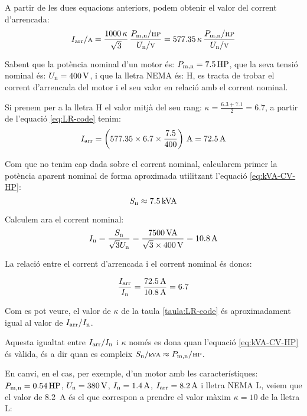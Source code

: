 A partir de les dues equacions anteriors, podem obtenir el valor del corrent d'arrencada:
\begin{equation}
    I\ped{arr}/{\scriptstyle \unit{A}} = \frac{1000 \,\kappa}{\sqrt{3}} \,\frac{P\ped{m,n}/{\scriptstyle \unit{HP}}}{U\ped{n}/{\scriptstyle \unit{V}}} = \num{577,35}\,\kappa\,\frac{P\ped{m,n}/{\scriptstyle \unit{HP}}}{U\ped{n}/{\scriptstyle \unit{V}}}\label{eq:LR-code}
\end{equation}


	
\begin{exemple}[\MotorArrencNEMA{}]
	\addcontentsxms{\MotorArrencNEMA}
    Sabent que la  potència nominal d'un motor és: $P_\mathrm{m,n} = \qty{7,5}{HP}$,    que la seva tensió nominal és: $U_\mathrm{n}=\qty{400}{V}$, i que la lletra NEMA és: H, es tracta de trobar el corrent d'arrencada  del  motor i el seu valor en relació amb el corrent nominal.

    Si prenem per a la lletra H el valor mitjà del seu rang: $\kappa = \frac{\num{6,3}+\num{7,1}}{2}=\num{6,7}$, a partir de l'equació  \eqref{eq:LR-code} tenim:
    \[
      I\ped{arr} = \left(\num{577,35} \times \num{6,7} \times \frac{\num{7,5}}{400}\right) \,\unit{A} = \qty{72,5}{A}
    \]

    Com que no tenim cap dada sobre el corrent nominal, calcularem primer la potència aparent nominal de forma aproximada utilitzant l'equació \eqref{eq:kVA-CV-HP}:
    \[
        S_\mathrm{n} \approx \qty{7,5}{kVA}
    \]

    Calculem ara el corrent nominal:
    \[
        I_\mathrm{n}= \frac{S_\mathrm{n}}{\sqrt{3} U_\mathrm{n}} = \frac{\qty{7500}{VA}}{\sqrt{3}\times\qty{400}{V}} = \qty{10,8}{A}
    \]

    La relació entre el corrent d'arrencada i el corrent nominal és doncs:
    
    \[
        \frac{I_\mathrm{arr}}{I_\mathrm{n}} = \frac{\qty{72,5}{A}}{\qty{10,8}{A}} = \num{6,7}
    \]

    Com es pot veure, el valor  de $\kappa$ de la taula \vref{taula:LR-code} és aproximadament igual al valor de $I_\mathrm{arr}/I_\mathrm{n}$.

    Aquesta igualtat entre $I_\mathrm{arr}/I_\mathrm{n}$ i $\kappa$ només es dona quan l'equació \eqref{eq:kVA-CV-HP} és vàlida, és a dir quan es compleix $S\ped{n}/{\scriptstyle \unit{kVA}} \approx  P\ped{m,n}/{\scriptstyle \unit{HP}}$.

    En canvi, en el cas, per exemple, d'un motor amb les característiques: $P_\mathrm{m,n} = \qty{0,54}{HP}$, $U_\mathrm{n} = \qty{380}{V}$, $I_\mathrm{n} = \qty{1,4}{A}$, $I_\mathrm{arr} = \qty{8,2}{A}$ i lletra NEMA L, veiem que el valor de \qty{8,2}{A} és el que correspon a prendre  el valor màxim $\kappa = 10$ de la lletra L:
    

\end{exemple}
